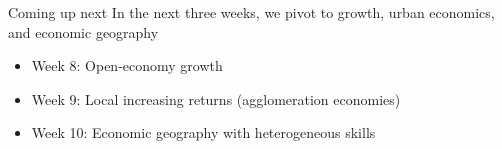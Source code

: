\documentclass[10pt,notes=hide]{beamer}
\begin{document}
\begin{frame}{Coming up next}
In the next three weeks, we pivot to growth, urban economics, and economic geography
\begin{itemize}
\item Week 8: Open-economy growth
\item Week 9: Local increasing returns (agglomeration economies)
\item Week 10: Economic geography with heterogeneous skills
\end{itemize}
\end{frame}
\end{document}
